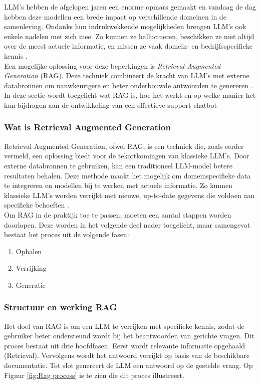 LLM's hebben de afgelopen jaren een enorme opmars gemaakt en vandaag de dag hebben deze modellen een brede impact op verschillende domeinen in de samenleving. Ondanks hun indrukwekkende mogelijkheden brengen LLM’s ook enkele nadelen met zich mee. Zo kunnen ze hallucineren, beschikken ze niet altijd over de meest actuele informatie, en missen ze vaak domein- en bedrijfsspecifieke kennis \autocite{akkiraju2024factsbuildingretrievalaugmented}.
\\[1em]
Een mogelijke oplossing voor deze beperkingen is \textit{Retrieval-Augmented Generation} (RAG). Deze techniek combineert de kracht van LLM’s met externe databronnen om nauwkeurigere en beter onderbouwde antwoorden te genereren \autocite{wu2025retrievalaugmentedgenerationnaturallanguage}. 
In deze sectie wordt toegelicht wat RAG is, hoe het werkt en op welke manier het kan bijdragen aan de ontwikkeling van een effectieve support chatbot

\subsubsection{Wat is Retrieval Augmented Generation}
Retrieval Augmented Generation, ofwel RAG, is een techniek die, zoals eerder vermeld, een oplossing biedt voor de tekortkomingen van klassieke LLM’s. Door externe databronnen te gebruiken, kan een traditioneel LLM-model betere resultaten behalen. Deze methode maakt het mogelijk om domeinspecifieke data te integreren en modellen bij te werken met actuele informatie. Zo kunnen klassieke LLM’s worden verrijkt met nieuwe, up-to-date gegevens die voldoen aan specifieke behoeften \autocite{wu2025retrievalaugmentedgenerationnaturallanguage}.
\\[1em]
Om RAG in de praktijk toe te passen, moeten een aantal stappen worden doorlopen. Deze worden in het volgende deel nader toegelicht, maar samengevat bestaat het proces uit de volgende fasen:

\begin{enumerate}
    \item {Ophalen}
    \item {Verrijking}
    \item {Generatie}
\end{enumerate}

\subsubsection{Structuur en werking RAG}

Het doel van RAG is om een LLM te verrijken met specifieke kennis, zodat de gebruiker beter ondersteund wordt bij het beantwoorden van gerichte vragen. Dit proces bestaat uit drie hoofdfasen. Eerst wordt relevante informatie opgehaald (Retrieval). Vervolgens wordt het antwoord verrijkt op basis van de beschikbare documentatie. Tot slot genereert de LLM een antwoord op de gestelde vraag. Op Figuur \ref{fig:Rag process} is te zien die dit proces illustreert.


